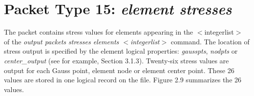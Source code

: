\documentclass[10pt]{report}
\numberwithin{equation}{section}
\newcommand{\ti}{\emph}
\begin{document}
%
%
\section{Packet Type 15: \ti{element stresses}}
The packet contains stress values for elements appearing in 
the $<$integerlist$>$ of the \ti{output packets stresses
 elements $<$integerlist$>$ }command. The location of stress 
 output is specified by the element logical properties: 
 \ti{gausspts}, \ti{nodpts} or \ti{center\_output}
 (see for example, Section 3.1.3). Twenty-six stress values are 
 output for each Gauss point, element node or element center point. 
 These 26 values are stored in one logical record on the file. 
 Figure 2.9 summarizes the 26 values. 
\end{document}
